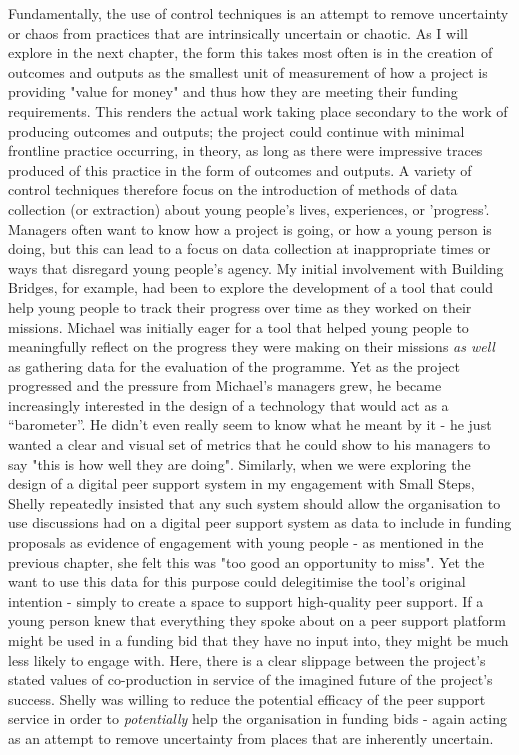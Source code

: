 Fundamentally, the use of control techniques is an attempt to remove uncertainty or chaos from practices that are intrinsically uncertain or chaotic. As I will explore in the next chapter, the form this takes most often is in the creation of outcomes and outputs as the smallest unit of measurement of how a project is providing "value for money" and thus how they are meeting their funding requirements. This renders the actual work taking place secondary to the work of producing outcomes and outputs; the project could continue with minimal frontline practice occurring, in theory, as long as there were impressive traces produced of this practice in the form of outcomes and outputs. A variety of control techniques therefore focus on the introduction of methods of data collection (or extraction) about young people’s lives, experiences, or 'progress'. Managers often want to know how a project is going, or how a young person is doing, but this can lead to a focus on data collection at inappropriate times or ways that disregard young people’s agency. My initial involvement with Building Bridges, for example, had been to explore the development of a tool that could help young people to track their progress over time as they worked on their missions. Michael was initially eager for a tool that helped young people to meaningfully reflect on the progress they were making on their missions \emph{as well} as gathering data for the evaluation of the programme. Yet as the project progressed and the pressure from Michael’s managers grew, he became increasingly interested in the design of a technology that would act as a “barometer”. He didn’t even really seem to know what he meant by it - he just wanted a clear and visual set of metrics that he could show to his managers to say "this is how well they are doing". Similarly, when we were exploring the design of a digital peer support system in my engagement with Small Steps, Shelly repeatedly insisted that any such system should allow the organisation to use discussions had on a digital peer support system as data to include in funding proposals as evidence of engagement with young people - as mentioned in the previous chapter, she felt this was "too good an opportunity to miss". Yet the want to use this data for this purpose could delegitimise the tool's original intention - simply to create a space to support high-quality peer support. If a young person knew that everything they spoke about on a peer support platform might be used in a funding bid that they have no input into, they might be much less likely to engage with. Here, there is a clear slippage between the project's stated values of co-production in service of the imagined future of the project's success. Shelly was willing to reduce the potential efficacy of the peer support service in order to \emph{potentially} help the organisation in funding bids - again acting as an attempt to remove uncertainty from places that are inherently uncertain.

